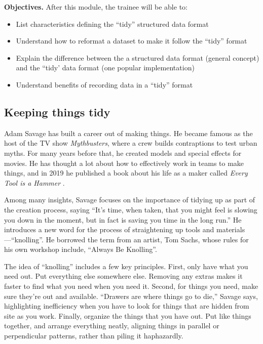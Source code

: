 \documentclass[]{tufte-book}
\providecommand{\tightlist}{%
  \setlength{\itemsep}{0pt}\setlength{\parskip}{0pt}}
\begin{document}
\textbf{Objectives.} After this module, the trainee will be able to:

\begin{itemize}
\tightlist
\item
  List characteristics defining the ``tidy'' structured data format
\item
  Understand how to reformat a dataset to make it follow the ``tidy'' format
\item
  Explain the difference between the a structured data format (general concept)
  and the ``tidy' data format (one popular implementation)
\item
  Understand benefits of recording data in a ``tidy'' format
\end{itemize}

\subsection{Keeping things tidy}\label{keeping-things-tidy}

Adam Savage has built a career out of making things. He became famous as the
host of the TV show \emph{Mythbusters}, where a crew builds contraptions to test
urban myths. For many years before that, he created models and special effects
for movies. He has thought a lot about how to effectively work in teams to make
things, and in 2019 he published a book about his life as a maker called \emph{Every
Tool is a Hammer} \citep{savage2020every}.

Among many insights, Savage focuses on the importance
of tidying up as part of the creation process, saying ``It's time, when taken,
that you might feel is slowing you down in the moment, but in fact is saving you
time in the long run.'' \citep{savage2020every} He introduces a new word for the
process of straightening up tools and materials---``knolling''. He borrowed the
term from an artist, Tom Sachs, whose rules for his own workshop include,
``Always Be Knolling''.

The idea of ``knolling'' includes a few key principles. First, only have what you
need out. Put everything else somewhere else. Removing any extras makes it
faster to find what you need when you need it. Second, for things you need, make
sure they're out and available. ``Drawers are where things go to die,'' Savage
says, highlighting inefficiency when you have to look
for things that are hidden from site as you work. Finally, organize the things
that you have out. Put like things together, and arrange everything neatly,
aligning things in parallel or perpendicular patterns, rather than piling it
haphazardly.
\end{document}
